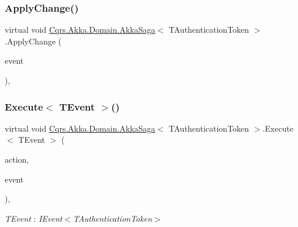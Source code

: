 \subsubsection{\texorpdfstring{Apply\+Change()}{ApplyChange()}\hspace{0.1cm}{\footnotesize\ttfamily [2/2]}}
{\footnotesize\ttfamily virtual void \hyperlink{classCqrs_1_1Akka_1_1Domain_1_1AkkaSaga}{Cqrs.\+Akka.\+Domain.\+Akka\+Saga}$<$ T\+Authentication\+Token $>$.Apply\+Change (\begin{DoxyParamCaption}\item[{\hyperlink{interfaceCqrs_1_1Events_1_1IEvent}{I\+Event}$<$ T\+Authentication\+Token $>$ @}]{event }\end{DoxyParamCaption})\hspace{0.3cm}{\ttfamily [protected]}, {\ttfamily [virtual]}}

\mbox{\label{classCqrs_1_1Akka_1_1Domain_1_1AkkaSaga_ac0782ac0b7e28418a52cead1b7b8b0c3_ac0782ac0b7e28418a52cead1b7b8b0c3}} 
\subsubsection{\texorpdfstring{Execute$<$ T\+Event $>$()}{Execute< TEvent >()}}
{\footnotesize\ttfamily virtual void \hyperlink{classCqrs_1_1Akka_1_1Domain_1_1AkkaSaga}{Cqrs.\+Akka.\+Domain.\+Akka\+Saga}$<$ T\+Authentication\+Token $>$.Execute$<$ T\+Event $>$ (\begin{DoxyParamCaption}\item[{Action$<$ T\+Event $>$}]{action,  }\item[{T\+Event @}]{event }\end{DoxyParamCaption})\hspace{0.3cm}{\ttfamily [protected]}, {\ttfamily [virtual]}}

\begin{Desc}
\item[Type Constraints]\begin{description}
\item[{\em T\+Event} : {\em I\+Event$<$T\+Authentication\+Token$>$}]\end{description}
\end{Desc}
\mbox{\label{classCqrs_1_1Akka_1_1Domain_1_1AkkaSaga_ac88061e29e3e2223db31ce9075835b46_ac88061e29e3e2223db31ce9075835b46}} 
